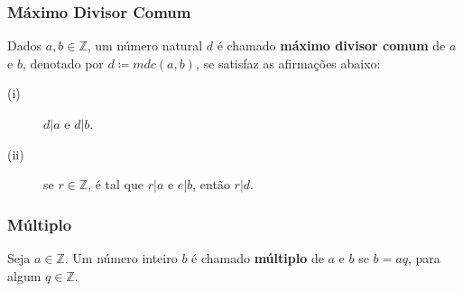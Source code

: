 \subsubsection*{Máximo Divisor Comum}
Dados $a, b \in \mathbb{Z}$, um número natural $d$ é chamado \textbf{máximo divisor comum} de  $a$ e $b$, denotado por $d \coloneqq mdc(a, b)$, se satisfaz as afirmações abaixo:
    \begin{description}
        \item[(i)] $d|a$ e $d|b$.
        \item[(ii)] se $r \in \mathbb{Z}$, é tal que $r|a$ e $e|b$, então $r|d$.
    \end{description}

\subsubsection*{Múltiplo}
Seja $a \in \mathbb{Z}$. Um número inteiro $b$ é chamado \textbf{múltiplo} de $a$ e $b$ se $b=aq$, para algum $q \in \mathbb{Z}$.
